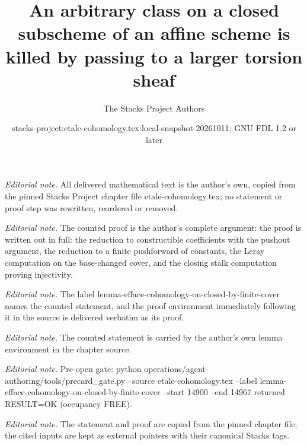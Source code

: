 \documentclass[10pt,a4paper]{amsart}
\title{An arbitrary class on a closed subscheme of an affine scheme is killed by passing to a larger torsion sheaf}
\author{The Stacks Project Authors}
\date{stacks-project:etale-cohomology.tex:local-snapshot-20261011; GNU FDL 1.2 or later}
\theoremstyle{plain}
\theoremstyle{definition}
\theoremstyle{remark}
\numberwithin{equation}{subsection}
\begin{document}
\maketitle
\noindent\textit{Editorial note.} All delivered mathematical text is the author's own, copied from the pinned Stacks Project chapter file etale-cohomology.tex; no statement or proof step was rewritten, reordered or removed.\par\medskip
\noindent\textit{Editorial note.} The counted proof is the author's complete argument: the proof is written out in full: the reduction to constructible coefficients with the pushout argument, the reduction to a finite pushforward of constants, the Leray computation on the base-changed cover, and the closing stalk computation proving injectivity.\par\medskip
\noindent\textit{Editorial note.} The label lemma-efface-cohomology-on-closed-by-finite-cover names the counted statement, and the proof environment immediately following it in the source is delivered verbatim as its proof.\par\medskip
\noindent\textit{Editorial note.} The counted statement is carried by the author's own lemma environment in the chapter source.\par\medskip
\noindent\textit{Editorial note.} Pre-open gate: python operations/agent-authoring/tools/precard\_gate.py --source etale-cohomology.tex --label lemma-efface-cohomology-on-closed-by-finite-cover --start 14900 --end 14967 returned RESULT=OK (occupancy FREE).\par\medskip
\noindent\textit{Editorial note.} The statement and proof are copied from the pinned chapter file; the cited inputs are kept as external pointers with their canonical Stacks tags.\par\medskip
\end{document}
